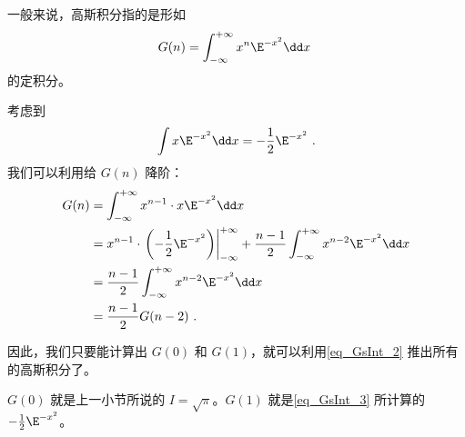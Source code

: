 一般来说，高斯积分指的是形如
\begin{equation}
G(n)=\int_{-\infty}^{+\infty} x^n\E^{-x^2}\dd x~
\end{equation}
的定积分。

考虑到
\begin{equation}\label{eq_GsInt_3}
\int x\E^{-x^2}\dd x=-\frac{1}{2}\E^{-x^2}~.
\end{equation}
我们可以利用给 $G(n)$ 降阶：
\begin{equation}\label{eq_GsInt_2}
\begin{aligned}
G(n)&=\int_{-\infty}^{+\infty} x^{n-1}\cdot x\E^{-x^2}\dd x\\
&=x^{n-1}\cdot\left.\left(-\frac{1}{2}\E^{-x^2}\right)\right|_{-\infty}^{+\infty}+\frac{n-1}{2}\int_{-\infty}^{+\infty} x^{n-2}\E^{-x^2}\dd x\\
&=\frac{n-1}{2}\int_{-\infty}^{+\infty} x^{n-2}\E^{-x^2}\dd x\\
&=\frac{n-1}{2}G(n-2)~.
\end{aligned}
\end{equation}

因此，我们只要能计算出 $G(0)$ 和 $G(1)$，就可以利用\autoref{eq_GsInt_2} 推出所有的高斯积分了。

$G(0)$ 就是上一小节所说的 $I=\sqrt{\pi}$。$G(1)$ 就是\autoref{eq_GsInt_3} 所计算的 $-\frac{1}{2}\E^{-x^2}$。









